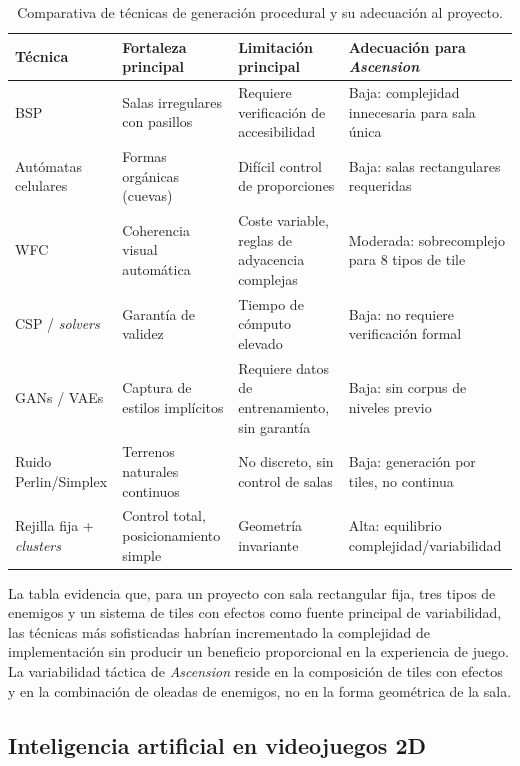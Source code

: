 \begin{table}[H]
\centering
{\small
\begin{tabular}{|p{}|p{}|p{}|p{}|}
\hline
\textbf{Técnica} & \textbf{Fortaleza principal} & \textbf{Limitación principal} & \textbf{Adecuación para \textit{Ascension}} \\ \hline
BSP & Salas irregulares con pasillos & Requiere verificación de accesibilidad & Baja: complejidad innecesaria para sala única \\ \hline
Autómatas celulares & Formas orgánicas (cuevas) & Difícil control de proporciones & Baja: salas rectangulares requeridas \\ \hline
WFC & Coherencia visual automática & Coste variable, reglas de adyacencia complejas & Moderada: sobrecomplejo para 8 tipos de tile \\ \hline
CSP / \textit{solvers} & Garantía de validez & Tiempo de cómputo elevado & Baja: no requiere verificación formal \\ \hline
GANs / VAEs & Captura de estilos implícitos & Requiere datos de entrenamiento, sin garantía & Baja: sin corpus de niveles previo \\ \hline
Ruido Perlin/Simplex & Terrenos naturales continuos & No discreto, sin control de salas & Baja: generación por tiles, no continua \\ \hline
Rejilla fija + \textit{clusters} & Control total, posicionamiento simple & Geometría invariante & Alta: equilibrio complejidad/variabilidad \\ \hline
\end{tabular}
}
\caption{Comparativa de técnicas de generación procedural y su adecuación al proyecto.}
\end{table}

La tabla evidencia que, para un proyecto con sala rectangular fija, tres tipos de enemigos y un sistema de tiles con efectos como fuente principal de variabilidad, las técnicas más sofisticadas habrían incrementado la complejidad de implementación sin producir un beneficio proporcional en la experiencia de juego. La variabilidad táctica de \textit{Ascension} reside en la composición de tiles con efectos y en la combinación de oleadas de enemigos, no en la forma geométrica de la sala.

\subsection{Inteligencia artificial en videojuegos 2D}


